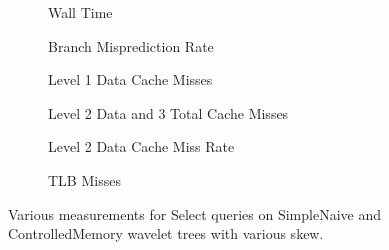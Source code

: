 \begin{figure}\tiny
\begin{subfigure}{0.48\textwidth}
	
	\caption{Wall Time}
	\label{fig:NaiveSelectSkewRunningTime}
\end{subfigure}
\hfill
\begin{subfigure}{0.48\textwidth}
	
	\caption{Branch Misprediction Rate}
	\label{fig:NaiveVsControlledNodeMemorySkewSelectQueryBMrate}
\end{subfigure}

\begin{subfigure}{0.48\textwidth}
	
	\caption{Level 1 Data Cache Misses}
	\label{fig:L1NaiveControlledNodeMemorySelectSkewCacheMisses}
\end{subfigure}
\hfill
\begin{subfigure}{0.48\textwidth}
 	
	\caption{Level 2 Data and 3 Total Cache Misses}
	\label{fig:L2L3NaiveControlledNodeMemorySelectSkewCacheMisses}
\end{subfigure}

\begin{subfigure}{0.48\textwidth}
	
	\caption{Level 2 Data Cache Miss Rate}
	\label{fig:NaiveVsControlledNodeMemorySkewSelectQuery_L2_DCMrate}
\end{subfigure}
\hfill
\begin{subfigure}{0.48\textwidth}
	
	\caption{TLB Misses}
	\label{fig:NaiveVsControlledNodeMemorySkewSelectQueryTLB}
\end{subfigure}

\caption{Various measurements for Select queries on SimpleNaive and ControlledMemory wavelet trees with various skew.}
\label{fig:NaiveVsControlledNodeMemorySkewSelectQuery}

\end{figure}


\restoregeometry